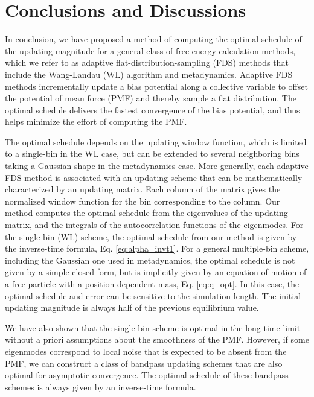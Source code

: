 \documentclass[reprint, superscriptaddress, floatfix]{revtex4-1}
\begin{document}
\section{\label{sec:conclusion}
Conclusions and Discussions}



In conclusion,
we have proposed a method of computing
the optimal schedule of the updating magnitude
for a general class of free energy calculation methods,
which we refer to as adaptive flat-distribution-sampling (FDS) methods
that include the Wang-Landau (WL) algorithm and metadynamics.
%
Adaptive FDS methods
incrementally update a bias potential
along a collective variable
to offset the potential of mean force (PMF)
and thereby sample a flat distribution.
%
The optimal schedule delivers the fastest convergence
of the bias potential,
and thus helps minimize the effort
of computing the PMF.


The optimal schedule depends on the updating window function,
which is limited to a single-bin in the WL case,
but can be extended to several neighboring bins
taking a Gaussian shape in the metadynamics case.
%
More generally,
each adaptive FDS method is associated with
an updating scheme
that can be mathematically characterized
by an updating matrix.
%
Each column of the matrix gives the normalized
window function for the bin corresponding to the column.
%
Our method computes the optimal schedule from
the eigenvalues of the updating matrix,
and the integrals of the autocorrelation functions
of the eigenmodes.
%
For the single-bin (WL) scheme,
the optimal schedule from our method
is given by the inverse-time formula,
Eq. \eqref{eq:alpha_invt1}.
%
For a general multiple-bin scheme,
including the Gaussian one used in metadynamics,
the optimal schedule is not given by a simple closed form,
but is implicitly given by an equation of motion
of a free particle with a position-dependent mass, Eq. \eqref{eq:q_opt}.
%
In this case,
the optimal schedule and error
can be sensitive to the simulation length.
%
The initial updating magnitude is always
half of the previous equilibrium value.

We have also shown that
the single-bin scheme is optimal
in the long time limit
without a priori assumptions
about the smoothness of the PMF.
%
However, if some eigenmodes
correspond to local noise
that is expected to be absent from the PMF,
we can construct a
class of bandpass updating schemes
that are also optimal for asymptotic convergence.
%
The optimal schedule of these bandpass schemes
is always given by an inverse-time formula.
\end{document}
